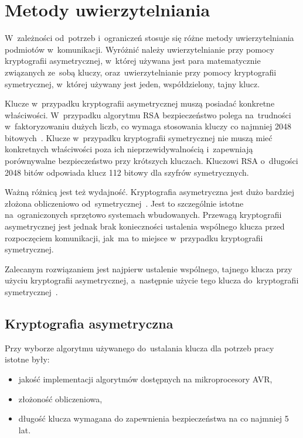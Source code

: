 \chapter{Metody uwierzytelniania}
\label{cha:metodyUwierzytelniania}

W~zależności od~potrzeb i~ograniczeń stosuje się różne metody uwierzytelniania podmiotów w~komunikacji. Wyróżnić należy uwierzytelnianie przy pomocy kryptografii asymetrycznej, w~której używana jest para matematycznie związanych ze~sobą kluczy, oraz~uwierzytelnianie przy pomocy kryptografii symetrycznej, w~której używany jest jeden, współdzielony, tajny klucz.

Klucze w~przypadku kryptografii asymetrycznej muszą posiadać konkretne właściwości. W~przypadku algorytmu RSA bezpieczeństwo polega na~trudności w~faktoryzowaniu dużych liczb, co wymaga stosowania kluczy co najmniej 2048 bitowych~\cite{Nist}. Klucze w~przypadku kryptografii symetrycznej nie muszą mieć konkretnych właściwości poza ich nieprzewidywalnością i~zapewniają porównywalne bezpieczeństwo przy krótszych kluczach. Kluczowi RSA o~długości 2048 bitów odpowiada klucz 112 bitowy dla szyfrów symetrycznych.

Ważną różnicą jest też wydajność. Kryptografia asymetryczna jest dużo bardziej złożona obliczeniowo od~symetrycznej~\cite{al2008comparative}. Jest to szczególnie istotne na~ograniczonych sprzętowo systemach wbudowanych. Przewagą kryptografii asymetrycznej jest jednak brak konieczności ustalenia wspólnego klucza przed rozpoczęciem komunikacji, jak~ma to miejsce w~przypadku kryptografii symetrycznej.

Zalecanym rozwiązaniem jest najpierw ustalenie wspólnego, tajnego klucza przy użyciu kryptografii asymetrycznej, a~następnie użycie tego klucza do~kryptografii symetrycznej~\cite{al2008comparative}.

\section{Kryptografia asymetryczna}
\label{sec:kryptoAsym}

Przy wyborze algorytmu używanego do~ustalania klucza dla potrzeb pracy istotne były:

\begin{itemize}
\item jakość implementacji algorytmów dostępnych na mikroprocesory AVR,
\item złożoność obliczeniowa,
\item długość klucza wymagana do zapewnienia bezpieczeństwa na co najmniej 5 lat.
\end{itemize}


